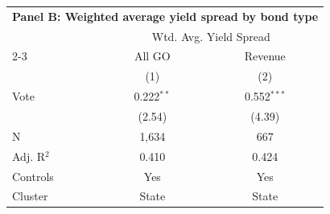 \begingroup
\centering
\begin{tabular*}{\textwidth}{@{\extracolsep{\fill}}lcc}
\multicolumn{3}{l}{\textbf{Panel B: Weighted average yield spread by bond type}}\\

\addlinespace
   \toprule
 & \multicolumn{2}{c}{Wtd. Avg. Yield Spread}\\
   \cmidrule(lr){2-3}
                  & All GO                      & Revenue \\   
                  & (1)                         & (2)\\  
   \midrule 
   Vote           & 0.222$^{**}$                & 0.552$^{***}$\\   
                  & (2.54)                     & (4.39)\\   
   \hline
   N   & 1,634                       & 667\\  
   Adj. R$^2$ & 0.410                       & 0.424\\  
   Controls                   & Yes & Yes\\
   Cluster              & State & State\\  
   \bottomrule
\end{tabular*}
\par\endgroup
